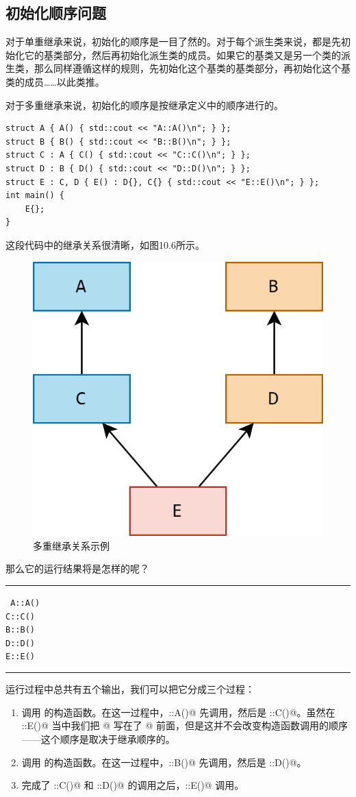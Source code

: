 \subsection*{初始化顺序问题}
对于单重继承来说，初始化的顺序是一目了然的。对于每个派生类来说，都是先初始化它的基类部分，然后再初始化派生类的成员。如果它的基类又是另一个类的派生类，那么同样遵循这样的规则，先初始化这个基类的基类部分，再初始化这个基类的成员……以此类推。\par\pagebreak
对于多重继承来说，初始化的顺序是按继承定义中的顺序进行的。
\begin{lstlisting}
struct A { A() { std::cout << "A::A()\n"; } };
struct B { B() { std::cout << "B::B()\n"; } };
struct C : A { C() { std::cout << "C::C()\n"; } };
struct D : B { D() { std::cout << "D::D()\n"; } };
struct E : C, D { E() : D{}, C{} { std::cout << "E::E()\n"; } };
int main() {
    E{};
}
\end{lstlisting}
这段代码中的继承关系很清晰，如图10.6所示。
\begin{figure}[htbp]
    \centering
    \includegraphics[width=.5\textwidth]{../images/generalized_parts/10_multiple_inheritance_example.drawio.png}
    \caption{多重继承关系示例}
\end{figure}
那么它的运行结果将是怎样的呢？\\\noindent\rule{\linewidth}{.2pt}\texttt{
A::A()\\
C::C()\\
B::B()\\
D::D()\\
E::E()
}\\\noindent\rule{\linewidth}{.2pt}
运行过程中总共有五个输出，我们可以把它分成三个过程：
\begin{enumerate}
    \item 调用 \lstinline@C@ 的构造函数。在这一过程中，\lstinline@A::A()@ 先调用，然后是 \lstinline@C::C()@。虽然在 \lstinline@E::E()@ 当中我们把 \lstinline@D{}@ 写在了 \lstinline@C{}@ 前面，但是这并不会改变构造函数调用的顺序——这个顺序是取决于继承顺序的。
    \item 调用 \lstinline@D@ 的构造函数。在这一过程中，\lstinline@B::B()@ 先调用，然后是 \lstinline@D::D()@。
    \item 完成了 \lstinline@C::C()@ 和 \lstinline@D::D()@ 的调用之后，\lstinline@E::E()@ 调用。
\end{enumerate}\par
